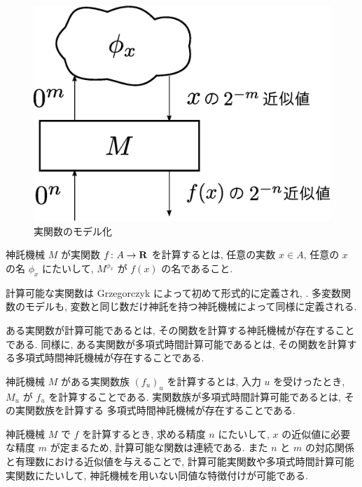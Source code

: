  \begin{figure}
  \label{fig:model-of-function}
  \begin{center}
   \includegraphics[height=0.15\textheight]{image/model-of-function.eps}
  \end{center}
  \caption{実関数のモデル化}
 \end{figure}

 \begin{definition}
  神託機械 $M$ が実関数 $f\colon A \to \mathbf R$ を計算するとは,
  任意の実数 $x \in A$, 任意の $x$ の名 $\phi_x$ にたいして,
  $M^{\phi_x}$ が $f(x)$ の名であること.
 \end{definition}
 計算可能な実関数は Grzegorczyk によって初めて形式的に定義され,
 \cite{grzegorczyk1955computable}.
 多変数関数のモデルも, 変数と同じ数だけ神託を持つ神託機械によって同様に定義される.

 ある実関数が計算可能であるとは, その関数を計算する神託機械が存在することである.
 同様に, ある実関数が多項式時間計算可能であるとは, その関数を計算する多項式時間神託機械が存在することである.

 神託機械 $M$ がある実関数族 $(f_u)_u$ を計算するとは,
 入力 $u$ を受けったとき, $M_u$ が $f_u$ を計算することである.
 実関数族が多項式時間計算可能であるとは, その実関数族を計算する
 多項式時間神託機械が存在することである.
 

 神託機械 $M$ で $f$ を計算するとき, 求める精度 $n$ にたいして,
 $x$ の近似値に必要な精度 $m$ が定まるため,
 計算可能な関数は連続である.
 また $n$ と $m$ の対応関係と有理数における近似値を与えることで,
 計算可能実関数や多項式時間計算可能実関数にたいして,
 神託機械を用いない同値な特徴付けが可能である.

